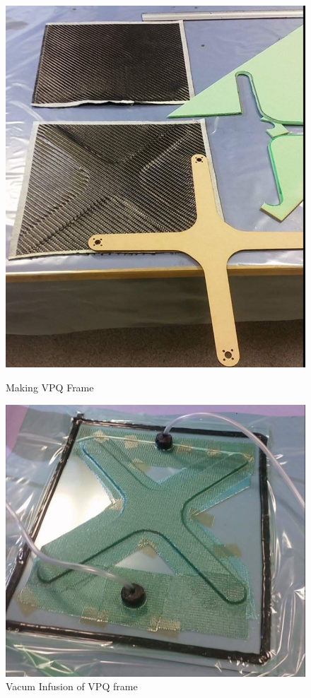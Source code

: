 \begin{figure}[H]
        \centering
                \begin{minipage}[b]{0.4\textwidth}
            \includegraphics[width = \textwidth, angle= 0]{VAPIQ-PICTURES/MakingVPQFrame}
            \caption{Making VPQ Frame}
                    \end{minipage}
                 \hfill
         \begin{minipage}[b]{0.52\textwidth}
            \includegraphics[width =\textwidth, angle =0]{VAPIQ-PICTURES/VacumInfusionVPQFrame}
              \caption{Vacum Infusion of VPQ frame}
        \end{minipage}


\end{figure}
